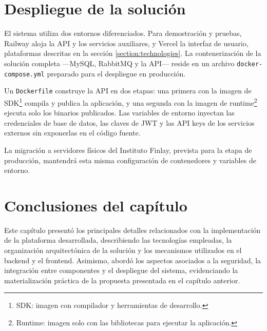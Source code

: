 \section{Despliegue de la solución}
\label{section:deployment}

El sistema utiliza dos entornos diferenciados. Para demostración y pruebas, Railway aloja la API y los servicios auxiliares, y Vercel la interfaz de usuario, plataformas descritas en la sección \ref{section:technologies}. La contenerización de la solución completa —MySQL, RabbitMQ y la API— reside en un archivo \texttt{docker-compose.yml} preparado para el despliegue en producción.

Un \texttt{Dockerfile} construye la API en dos etapas: una primera con la imagen de SDK\footnote{SDK: imagen con compilador y herramientas de desarrollo.} compila y publica la aplicación, y una segunda con la imagen de runtime\footnote{Runtime: imagen solo con las bibliotecas para ejecutar la aplicación.} ejecuta solo los binarios publicados. Las variables de entorno inyectan las credenciales de base de datos, las claves de JWT y las API keys de los servicios externos sin exponerlas en el código fuente.

La migración a servidores físicos del Instituto Finlay, prevista para la etapa de producción, mantendrá esta misma configuración de contenedores y variables de entorno.


\section{Conclusiones del capítulo}
\label{section:chapter_conclusions}

Este capítulo presentó los principales detalles relacionados con la implementación de la plataforma desarrollada, describiendo las tecnologías empleadas, la organización arquitectónica de la solución y los mecanismos utilizados en el backend y el frontend. 
Asimismo, abordó los aspectos asociados a la seguridad, la integración entre componentes y el despliegue del sistema, evidenciando la materialización práctica de la propuesta presentada en el capítulo anterior.
